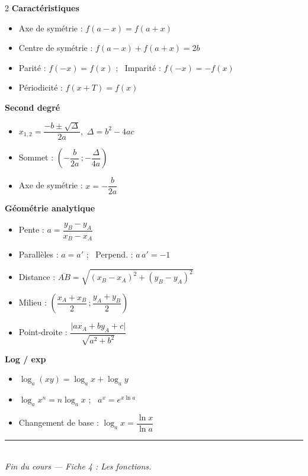 \documentclass[11pt,a4paper]{article}
\begin{document}
\begin{tcolorbox}[boxbase,colback=primary!5,colframe=primary,
    title={\textsc{Les formules incontournables de la fiche}}]
\begin{multicols}{2}
\small
\textbf{Caractéristiques}
\begin{itemize}[leftmargin=1.2em,topsep=1pt,itemsep=2pt]
  \item Axe de symétrie : $f(a-x)=f(a+x)$
  \item Centre de symétrie : $f(a-x)+f(a+x)=2b$
  \item Parité : $f(-x)=f(x)$ ; \ Imparité : $f(-x)=-f(x)$
  \item Périodicité : $f(x+T)=f(x)$
\end{itemize}

\textbf{Second degré}
\begin{itemize}[leftmargin=1.2em,topsep=1pt,itemsep=2pt]
  \item $x_{1,2}=\dfrac{-b\pm\sqrt{\Delta}}{2a}$,\ $\Delta=b^2-4ac$
  \item Sommet : $\left(-\dfrac{b}{2a}\,;-\dfrac{\Delta}{4a}\right)$
  \item Axe de symétrie : $x=-\dfrac{b}{2a}$
\end{itemize}

\columnbreak

\textbf{Géométrie analytique}
\begin{itemize}[leftmargin=1.2em,topsep=1pt,itemsep=2pt]
  \item Pente : $a=\dfrac{y_B-y_A}{x_B-x_A}$
  \item Parallèles : $a=a'$ ; \ Perpend. : $a\,a'=-1$
  \item Distance : $\overline{AB}=\sqrt{(x_B-x_A)^2+(y_B-y_A)^2}$
  \item Milieu : $\left(\dfrac{x_A+x_B}{2}\,;\dfrac{y_A+y_B}{2}\right)$
  \item Point-droite : $\dfrac{\lvert ax_A+by_A+c\rvert}{\sqrt{a^2+b^2}}$
\end{itemize}

\textbf{Log / exp}
\begin{itemize}[leftmargin=1.2em,topsep=1pt,itemsep=2pt]
  \item $\log_a(xy)=\log_a x+\log_a y$
  \item $\log_a x^n=n\log_a x$ ; \ $a^x=e^{x\ln a}$
  \item Changement de base : $\log_a x=\dfrac{\ln x}{\ln a}$
\end{itemize}
\end{multicols}
\end{tcolorbox}

\begin{center}
\vspace{0.3cm}
{\color{primary}\rule{0.5\linewidth}{1pt}}\\[4pt]
{\small\itshape Fin du cours — Fiche 4 : Les fonctions.}
\end{center}

\end{document}
